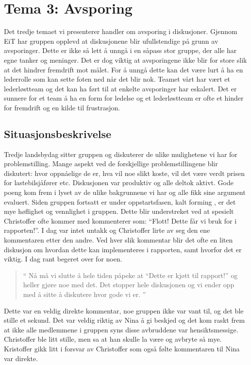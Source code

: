 \chapter{Tema 3: Avsporing}

Det tredje temaet vi presenterer handler om avsporing i diskusjoner. Gjennom EiT har gruppen opplevd at diskusjonene
blir ufullstendige på grunn av avsporinger. Dette er ikke så lett å unngå i en såpass stor gruppe, der alle har egne tanker og meninger.
Det er dog viktig at avsporingene ikke blir for store slik at det hindrer fremdrift mot målet. For å unngå dette kan det være lurt
å ha en lederrolle som kan sette foten ned når det blir nok. Teamet vårt har vært et lederløstteam og det kan ha ført til at 
enkelte avsporinger har eskalert. Det er sunnere for et team å ha en form for ledelse og et lederløstteam er ofte et hinder for 
fremdrift og en kilde til frustrasjon. \cite{Artikkel4}

\section{Situasjonsbeskrivelse}
Tredje landsbydag sitter gruppen og diskuterer de ulike mulighetene vi har for problemstilling. Mange aspekt ved de forskjellige 
problemstillingene blir diskutert: hvor oppnåelige de er, hva vil noe slikt koste, vil det være verdt prisen for lastebilsjåfører etc. Diskusjonen var
produktiv og alle deltok aktivt. Gode poeng kom frem i lyset av de ulike bakgrunnene vi har og alle fikk sine argument evaluert. 
Siden gruppen fortsatt er under oppstartsfasen, kalt forming 
\cite{forming}, er det mye høflighet og vennlighet i gruppen. Dette blir understreket ved at spesielt Christoffer ofte kommer med kommenterer 
som: ``Flott! Dette får vi bruk for i rapporten!''. I dag var intet untakk og Christoffer lirte av seg den ene kommentaren etter den andre. Ved hver 
slik kommentar blir det ofte en liten diskusjon om hvordan dette kan implementeres i 
rapporten, samt hvorfor det er viktig. I dag rant begeret over for noen.

\begin{quote}``
Nå må vi slutte å hele tiden påpeke at ``Dette er kjøtt til rapport!'' og heller gjøre noe med det. Det stopper hele diskusjonen og vi
ender opp med å sitte å diskutere hvor gode vi er. 
''\end{quote} 

Dette var en veldig direkte kommentar, noe gruppen ikke var vant til, og det ble stille et sekund. Det var veldig riktig av Nina å gi beskjed og det kom raskt frem at ikke alle medlemmene i gruppen syns disse avbruddene var hensiktsmessige. 
Christoffer ble litt stille, men sa at han skulle la være og avbryte
så mye. Kristoffer gikk litt i forsvar av Christoffer som også følte kommentaren til Nina var direkte.

